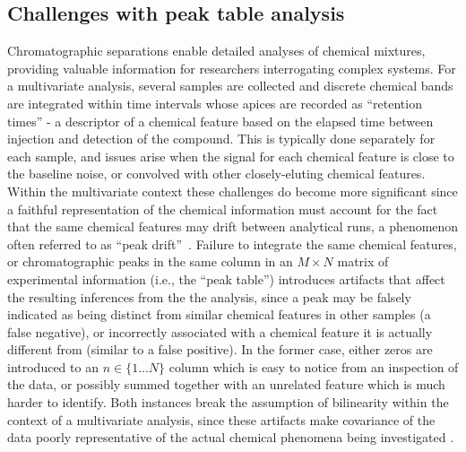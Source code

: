\documentclass[preprint,12pt]{elsarticle}
\begin{document}
\subsection{Challenges with peak table analysis}
Chromatographic separations enable detailed analyses of chemical mixtures, providing valuable information for researchers interrogating complex systems. For a multivariate analysis, several samples are collected and discrete chemical bands are integrated within time intervals whose apices are recorded as ``retention times'' - a descriptor of a chemical feature based on the elapsed time between injection and detection of the compound. This is typically done separately for each sample, and issues arise when the signal for each chemical feature is close to the baseline noise, or convolved with other closely-eluting chemical features. Within the multivariate context these challenges do become more significant since a faithful representation of the chemical information must account for the fact that the same chemical features may drift between analytical runs, a phenomenon often referred to as ``peak drift''~\cite{christensen2005chromatographic}. Failure to integrate the same chemical features, or chromatographic peaks in the same column in an $M \times N$ matrix of experimental information (i.e., the ``peak table'') introduces artifacts that affect the resulting inferences from the the analysis, since a peak may be falsely indicated as being distinct from similar chemical features in other samples (a false negative), or incorrectly associated with a chemical feature it is actually different from (similar to a false positive). In the former case, either zeros are introduced to an $n \in \{1...N\}$ column which is easy to notice from an inspection of the data, or possibly summed together with an unrelated feature which is much harder to identify. Both instances break the assumption of bilinearity within the context of a multivariate analysis, since these artifacts make covariance of the data poorly representative of the actual chemical phenomena being investigated \cite{armstrong2023parafac2}.
\end{document}
